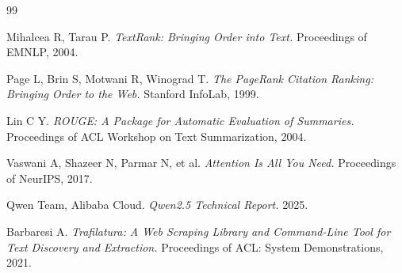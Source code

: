 \documentclass[12pt,a4paper]{ctexart}
\begin{document}
\begin{thebibliography}{99}

Mihalcea R, Tarau P.
\textit{TextRank: Bringing Order into Text.}
Proceedings of EMNLP, 2004.

Page L, Brin S, Motwani R, Winograd T.
\textit{The PageRank Citation Ranking: Bringing Order to the Web.}
Stanford InfoLab, 1999.

Lin C Y.
\textit{ROUGE: A Package for Automatic Evaluation of Summaries.}
Proceedings of ACL Workshop on Text Summarization, 2004.

Vaswani A, Shazeer N, Parmar N, et al.
\textit{Attention Is All You Need.}
Proceedings of NeurIPS, 2017.

Qwen Team, Alibaba Cloud.
\textit{Qwen2.5 Technical Report.}
2025.

Barbaresi A.
\textit{Trafilatura: A Web Scraping Library and Command-Line Tool for Text Discovery and Extraction.}
Proceedings of ACL: System Demonstrations, 2021.

\end{thebibliography}
\end{document}
